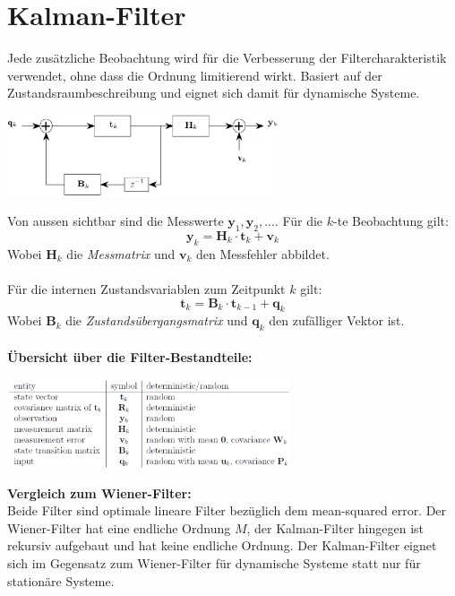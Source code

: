 \section{Kalman-Filter}
Jede zusätzliche Beobachtung wird für die Verbesserung der Filtercharakteristik verwendet, 
ohne dass die Ordnung limitierend wirkt. Basiert auf der Zustandsraumbeschreibung und 
eignet sich damit für dynamische Systeme.
\begin{center}
	\includegraphics[width=0.6\textwidth]{../fig/kalmann_modell}
\end{center}
Von aussen sichtbar sind die Messwerte $\textbf{y}_1, \textbf{y}_2,...$. Für die $k$-te 
Beobachtung gilt:
\[ \textbf{y}_k = \textbf{H}_k \cdot \textbf{t}_k + \textbf{v}_k \]
Wobei $\textbf{H}_k$ die \emph{Messmatrix} und $\textbf{v}_k$ den Messfehler abbildet. \\\\
Für die internen Zustandsvariablen zum Zeitpunkt $k$ gilt:
\[ \textbf{t}_k = \textbf{B}_k \cdot \textbf{t}_{k-1} + \textbf{q}_k \]
Wobei $\textbf{B}_k$ die \emph{Zustandsübergangsmatrix} und $\textbf{q}_k$ den zufälliger 
Vektor ist. \\\\
\textbf{Übersicht über die Filter-Bestandteile:}
\begin{flushleft}
	\includegraphics[width=0.625\textwidth]{../fig/kalmann_bestandteile}
\end{flushleft}
\textbf{Vergleich zum Wiener-Filter:\\}
Beide Filter sind optimale lineare Filter bezüglich dem mean-squared error. 
Der Wiener-Filter hat eine endliche Ordnung $M$, der Kalman-Filter hingegen
ist rekursiv aufgebaut und hat keine endliche Ordnung. Der Kalman-Filter 
eignet sich im Gegensatz zum Wiener-Filter für dynamische Systeme statt
nur für stationäre Systeme.